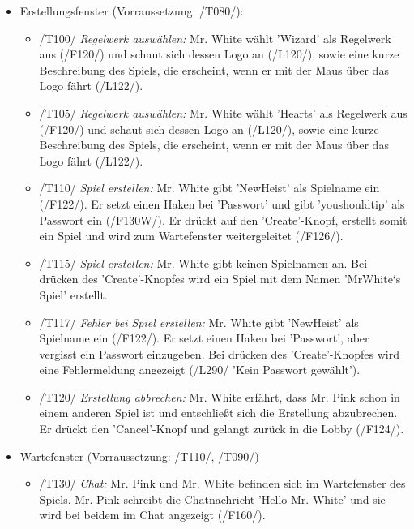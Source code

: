 \documentclass{article}
\begin{document}
\begin{itemize}
	\item Erstellungsfenster (Vorraussetzung: /T080/): 
	
	\begin{itemize}
	
		\item /T100/ \textit{Regelwerk auswählen:} Mr. White wählt 'Wizard' als Regelwerk aus (/F120/) und schaut sich dessen Logo an (/L120/), sowie eine kurze Beschreibung des Spiels, die erscheint, wenn er mit der Maus über das Logo fährt (/L122/).
		
		\item /T105/ \textit{Regelwerk auswählen:} Mr. White wählt 'Hearts' als Regelwerk aus (/F120/) und schaut sich dessen Logo an (/L120/), sowie eine kurze Beschreibung des Spiels, die erscheint, wenn er mit der Maus über das Logo fährt (/L122/).
		
		\item /T110/ \textit{Spiel erstellen:} Mr. White gibt 'NewHeist' als Spielname ein (/F122/). Er setzt einen Haken bei 'Passwort' und gibt 'youshouldtip' als Passwort ein (/F130W/). Er drückt auf den 'Create'-Knopf, erstellt somit ein Spiel und wird zum Wartefenster weitergeleitet (/F126/).
		
		\item /T115/ \textit{Spiel erstellen:} Mr. White gibt keinen Spielnamen an. Bei drücken des 'Create'-Knopfes wird ein Spiel mit dem Namen 'MrWhite`s Spiel' erstellt.
		
		\item /T117/ \textit{Fehler bei Spiel erstellen:} Mr. White gibt 'NewHeist' als Spielname ein (/F122/). Er setzt einen Haken bei 'Passwort', aber vergisst ein Passwort einzugeben. Bei drücken des 'Create'-Knopfes wird eine Fehlermeldung angezeigt (/L290/ 'Kein Passwort gewählt').
		
		\item /T120/ \textit{Erstellung abbrechen:} Mr. White erfährt, dass Mr. Pink schon in einem anderen Spiel ist und entschließt sich die Erstellung abzubrechen. Er drückt den 'Cancel'-Knopf und gelangt zurück in die Lobby (/F124/).
	
	\end{itemize}
	
	\item Wartefenster (Vorraussetzung: /T110/, /T090/)
	
	\begin{itemize}
		
		\item /T130/ \textit{Chat:} Mr. Pink und Mr. White befinden sich im Wartefenster des Spiels. Mr. Pink schreibt die Chatnachricht 'Hello Mr. White' und sie wird bei beidem im Chat angezeigt (/F160/).
		

\end{itemize}
\end{itemize}
\end{document}
